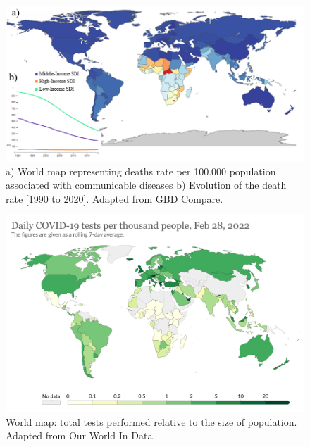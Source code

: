 \begin{figure}[ht]
    \centering
    \includegraphics[width=1\textwidth]{figures/Deaths map.png}
    \caption[Summary of world rate deaths burden associated with communicable diseases.]{a) World map representing deaths rate per 100.000 population associated with communicable diseases b) Evolution of the death rate [1990 to 2020]. Adapted from GBD Compare\cite{institute_for_health_metrics_and_evaluation_ihme_uniersity_of_washington_gbd_2015}.}
    \label{fig:Deaths}
\end{figure}
\begin{figure}[b]
    \centering
    \includegraphics[width=1\textwidth]{figures/diagnosis map.png}
    \caption[World map: total tests performed relative to the size of population.] {World map: total tests performed relative to the size of population. Adapted from Our World In Data\cite{ritchie_coronavirus_2020}.}
    \label{fig:Diagnosis}
\end{figure}
\newpage
